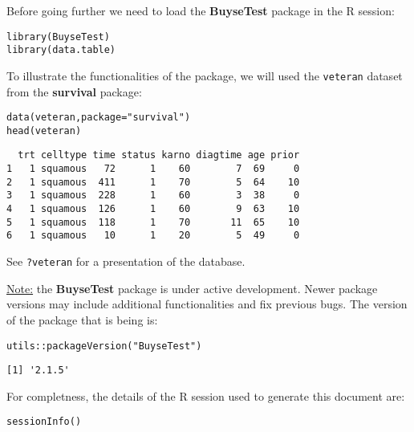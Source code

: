 \documentclass[12pt]{article}
\begin{document}
\clearpage

Before going further we need to load the \textbf{BuyseTest} package in the R
session:
\lstset{language=r,label= ,caption= ,captionpos=b,numbers=none}
\begin{lstlisting}
library(BuyseTest)
library(data.table)
\end{lstlisting}

To illustrate the functionalities of the package, we will used the
\texttt{veteran} dataset from the \textbf{survival} package:
\lstset{language=r,label= ,caption= ,captionpos=b,numbers=none}
\begin{lstlisting}
data(veteran,package="survival")
head(veteran)
\end{lstlisting}

\begin{verbatim}
  trt celltype time status karno diagtime age prior
1   1 squamous   72      1    60        7  69     0
2   1 squamous  411      1    70        5  64    10
3   1 squamous  228      1    60        3  38     0
4   1 squamous  126      1    60        9  63    10
5   1 squamous  118      1    70       11  65    10
6   1 squamous   10      1    20        5  49     0
\end{verbatim}

See \texttt{?veteran} for a presentation of the database.

\bigskip

\uline{Note:} the \textbf{BuyseTest} package is under active development. Newer
package versions may include additional functionalities and fix
previous bugs. The version of the package that is being is:
\lstset{language=r,label= ,caption= ,captionpos=b,numbers=none}
\begin{lstlisting}
utils::packageVersion("BuyseTest")
\end{lstlisting}

\begin{verbatim}
[1] '2.1.5'
\end{verbatim}

For completness, the details of the R session used to generate this
document are:
\lstset{language=r,label= ,caption= ,captionpos=b,numbers=none}
\begin{lstlisting}
sessionInfo()
\end{lstlisting}
\end{document}
